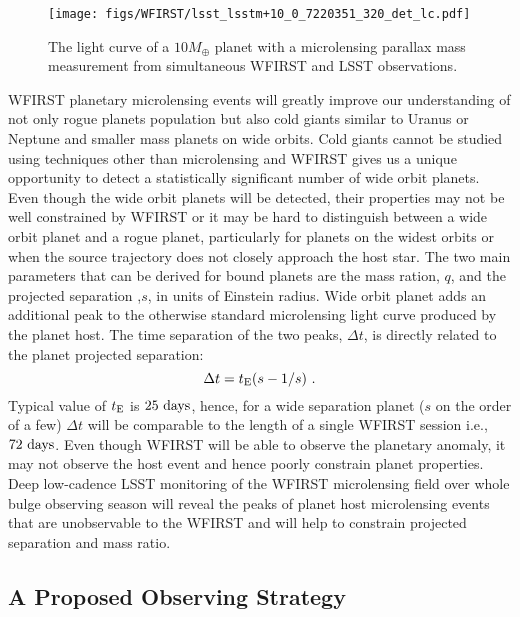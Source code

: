 \begin{figure}[t]
\centering\texttt{[image: figs/WFIRST/lsst\_lsstm+10\_0\_7220351\_320\_det\_lc.pdf]}
\caption{The light curve of a $10 M_{\oplus}$ planet with a microlensing parallax
mass measurement from simultaneous WFIRST and LSST observations.
\label{fig-lc}}
\end{figure}

WFIRST planetary microlensing events will greatly improve our
understanding of not only rogue planets population but also cold giants similar to
Uranus or Neptune and smaller mass planets on wide orbits. Cold giants
cannot be studied using techniques other than microlensing and
WFIRST gives us a unique opportunity to detect a statistically significant
number of wide orbit planets. Even though the wide orbit planets will be detected,
their properties may not be well constrained by WFIRST or it may be hard to distinguish
between a wide orbit planet and a rogue planet, particularly for planets on the widest
orbits or when the source trajectory does not closely approach the host star.
The two main parameters that can be derived for bound planets are
the mass ration, $q$, and the projected separation ,$s$, in units of Einstein radius.
Wide orbit planet adds an additional peak to the otherwise
standard microlensing light curve produced by the planet host.
The time separation of the two peaks, $\Delta t$, is directly related
to the planet projected separation:
\begin{equation}
 \Delta t =  t_{\rm E}(s - {1/s}) \ .
\end{equation}
Typical value of $t_{\rm E}$ is $25~{\rm days}$, hence, for a wide
separation planet ($s$ on the order of a few) $\Delta t$ will be
comparable to the length of a single WFIRST session i.e., $72~{\rm days}$.
Even though WFIRST will be able to observe the planetary anomaly,
it may not observe the host event and hence poorly constrain planet properties. Deep low-cadence LSST
monitoring of the WFIRST microlensing field over whole bulge observing season
will reveal the peaks of planet host microlensing events that are unobservable
to the WFIRST and will help to constrain projected separation and mass ratio.



\subsection{A Proposed Observing Strategy}
\label{sec:\secname:proposal}


